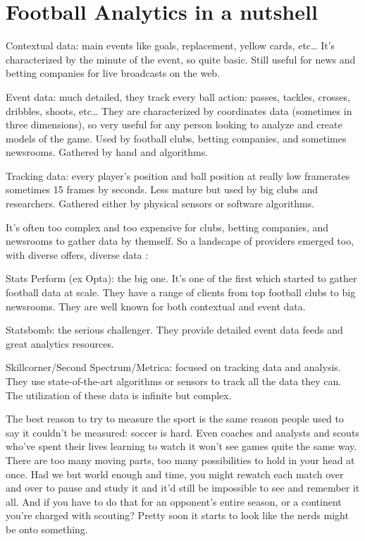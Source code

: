 \section{Football Analytics in a nutshell}

Contextual data: main events like goals, replacement, yellow cards, etc… 
It’s characterized by the minute of the event, so quite basic. Still useful 
for news and betting companies for live broadcasts on the web.

Event data: much detailed, they track every ball action: passes, tackles, 
crosses, dribbles, shoots, etc… They are characterized by coordinates data 
(sometimes in three dimensions), so very useful for any person looking to 
analyze and create models of the game. Used by football clubs, betting 
companies, and sometimes newsrooms. Gathered by hand and algorithms.

Tracking data: every player's position and ball position at really low 
framerates sometimes 15 frames by seconds. Less mature but used by big 
clubs and researchers. Gathered either by physical sensors or software 
algorithms.

It’s often too complex and too expensive for clubs, betting companies, 
and newsrooms to gather data by themself. So a landscape of providers 
emerged too, with diverse offers, diverse data :

Stats Perform (ex Opta): the big one. It’s one of the first which started 
to gather football data at scale. They have a range of clients from top 
football clubs to big newsrooms. They are well known for both contextual 
and event data.

Statsbomb: the serious challenger. They provide detailed event data feeds 
and great analytics resources.

Skillcorner/Second Spectrum/Metrica: focused on tracking data and analysis. 
They use state-of-the-art algorithms or sensors to track all the data they 
can. The utilization of these data is infinite but complex.


The best reason to try to measure the sport is the same reason people 
used to say it couldn’t be measured: soccer is hard. Even coaches and 
analysts and scouts who’ve spent their lives learning to watch it won’t 
see games quite the same way. There are too many moving parts, too many 
possibilities to hold in your head at once. Had we but world enough and 
time, you might rewatch each match over and over to pause and study it 
and it’d still be impossible to see and remember it all. And if you have 
to do that for an opponent’s entire season, or a continent you’re charged 
with scouting? Pretty soon it starts to look like the nerds might be onto 
something.

